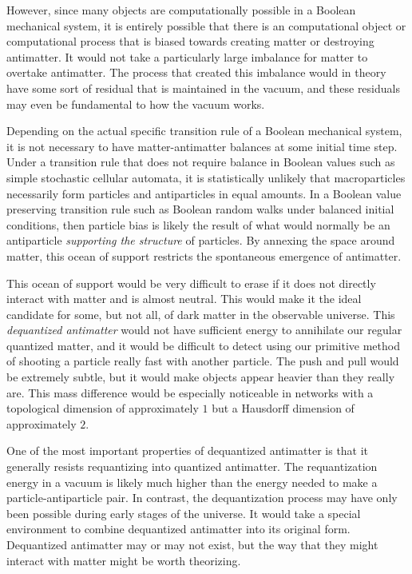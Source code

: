 \documentclass[10pt, a5paper, twoside, openright]{memoir}
\begin{document}
However, since many objects are computationally possible in a Boolean mechanical system, it is entirely possible that there is an computational object or computational process that is biased towards creating matter or destroying antimatter. It would not take a particularly large imbalance for matter to overtake antimatter. The process that created this imbalance would in theory have some sort of residual that is maintained in the vacuum, and these residuals may even be fundamental to how the vacuum works.

Depending on the actual specific transition rule of a Boolean mechanical system, it is not necessary to have matter-antimatter balances at some initial time step. Under a transition rule that does not require balance in Boolean values such as simple stochastic cellular automata, it is statistically unlikely that macroparticles necessarily form particles and antiparticles in equal amounts. In a Boolean value preserving transition rule such as Boolean random walks under balanced initial conditions, then particle bias is likely the result of what would normally be an antiparticle \textit{supporting the structure} of particles. By annexing the space around matter, this ocean of support restricts the spontaneous emergence of antimatter.

This ocean of support would be very difficult to erase if it does not directly interact with matter and is almost neutral. This would make it the ideal candidate for some, but not all, of dark matter in the observable universe. This \textit{dequantized antimatter} would not have sufficient energy to annihilate our regular quantized matter, and it would be difficult to detect using our primitive method of shooting a particle really fast with another particle. The push and pull would be extremely subtle, but it would make objects appear heavier than they really are. This mass difference would be especially noticeable in networks with a topological dimension of approximately $1$ but a Hausdorff dimension of approximately $2$.

One of the most important properties of dequantized antimatter is that it generally resists requantizing into quantized antimatter. The requantization energy in a vacuum is likely much higher than the energy needed to make a particle-antiparticle pair. In contrast, the dequantization process may have only been possible during early stages of the universe. It would take a special environment to combine dequantized antimatter into its original form. Dequantized antimatter may or may not exist, but the way that they might interact with matter might be worth theorizing.
\end{document}
